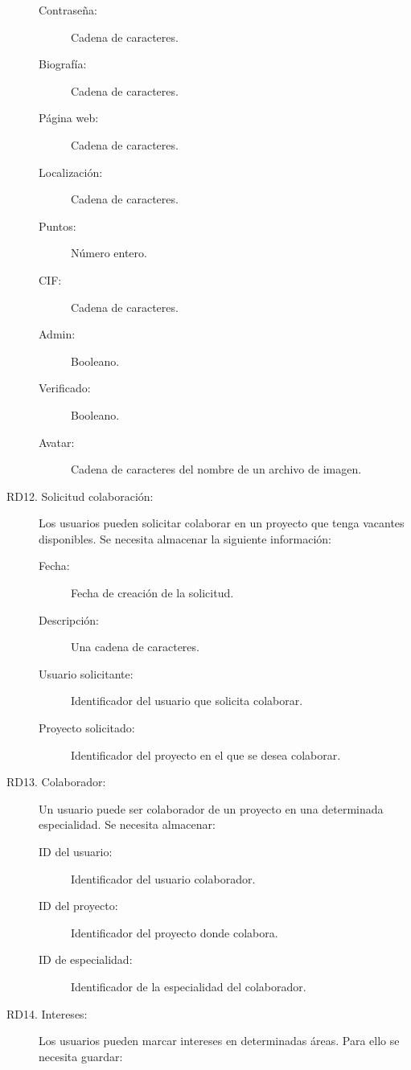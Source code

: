 \begin{description}
\begin{description}
            \item[Contraseña:] Cadena de caracteres.
            \item[Biografía:] Cadena de caracteres.
            \item[Página web:] Cadena de caracteres.
            \item[Localización:] Cadena de caracteres.
            \item[Puntos:] Número entero.
            \item[CIF:] Cadena de caracteres.
            \item[Admin:] Booleano.
            \item[Verificado:] Booleano.
            \item[Avatar:] Cadena de caracteres del nombre de un archivo de imagen.
        \end{description}
    \item[RD12. Solicitud colaboración:] Los usuarios pueden solicitar colaborar en un proyecto que tenga vacantes disponibles. Se necesita almacenar la siguiente información:
        \begin{description}
            \item[Fecha:] Fecha de creación de la solicitud.
            \item[Descripción:] Una cadena de caracteres.
            \item[Usuario solicitante:] Identificador del usuario que solicita colaborar.
            \item[Proyecto solicitado:] Identificador del proyecto en el que se desea colaborar.
        \end{description}
    \item[RD13. Colaborador:] Un usuario puede ser colaborador de un proyecto en una determinada especialidad. Se necesita almacenar:
        \begin{description}
            \item[ID del usuario:] Identificador del usuario colaborador.
            \item[ID del proyecto:] Identificador del proyecto donde colabora.
            \item[ID de especialidad:] Identificador de la especialidad del colaborador.
        \end{description}
    \item[RD14. Intereses:] Los usuarios pueden marcar intereses en determinadas áreas. Para ello se necesita guardar:
        \begin{description}

\end{description}
\end{description}
